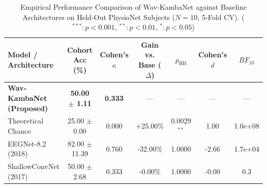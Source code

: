 \begin{table}[t]
\centering
\small
\caption{Empirical Performance Comparison of Wav-KambaNet against Baseline Architectures on Held-Out PhysioNet Subjects ($N=10$, 5-Fold CV). ($^{***}: p < 0.001$, $^{**}: p < 0.01$, $^{*}: p < 0.05$)}
\label{tab:baseline_comparison}
\begin{tabular}{lcccccc}
\toprule
\textbf{Model / Architecture} & \textbf{Cohort Acc (\%)} & \textbf{Cohen's $\kappa$} & \textbf{Gain vs. Base ($\Delta$)} & \textbf{$p_{\text{HB}}$} & \textbf{Cohen's $d$} & \textbf{$BF_{10}$} \\
\midrule
\textbf{Wav-KambaNet (Proposed)} & \textbf{50.00 $\pm$ 1.11} & \textbf{0.333} & --- & --- & --- & --- \\
\midrule
Theoretical Chance & 25.00 $\pm$ 0.00 & 0.000 & +25.00\% & 0.0029$^{**}$ & 1.00 & 1.0e+08 \\
EEGNet-8,2 (2018) & 82.00 $\pm$ 11.39 & 0.760 & -32.00\% & 1.0000 & -2.66 & 1.7e+04 \\
ShallowConvNet (2017) & 50.00 $\pm$ 2.68 & 0.333 & -0.00\% & 1.0000 & -0.00 & 0.3 \\
\bottomrule
\end{tabular}
\end{table}